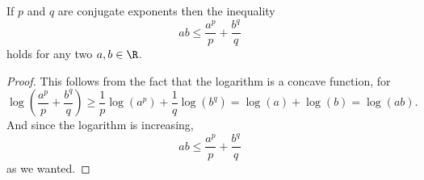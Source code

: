 \documentclass[12pt,oneside]{book}
\begin{document}
\begin{theorem}\label{theo:young}
	If \( p \) and \( q \) are conjugate exponents then the inequality
	\begin{equation*}
		ab \leq \frac{a^p}{p} + \frac{b^q}{q}
	\end{equation*}
	holds for any two \( a, b \in \R \).
\end{theorem}
\begin{proof}
	This follows from the fact that the logarithm is a concave function, for
	\begin{equation*}
		\log\left(\frac{a^p}{p} + \frac{b^q}{q}\right) \geq \frac{1}{p} \log\left(a^p\right) +
		\frac{1}{q}\log\left(b^q\right) = \log(a) + \log(b) = \log(ab).
	\end{equation*}
	And since the logarithm is increasing,
	\begin{equation*}
		ab \leq \frac{a^p}{p} + \frac{b^q}{q}
	\end{equation*}
	as we wanted.
\end{proof}
\end{document}
